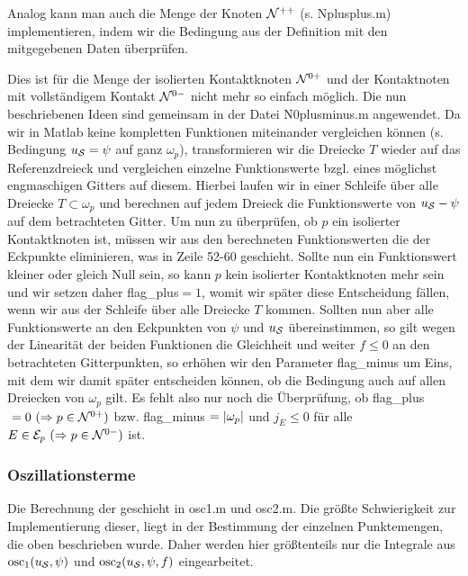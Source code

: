 Analog kann man auch die Menge der Knoten $\mathcal N^{++}$ (s. {\ttfamily Nplusplus.m})  implementieren, indem wir  die Bedingung aus der Definition mit den mitgegebenen Daten überprüfen.

Dies ist für die Menge der isolierten Kontaktknoten $\mathcal N^{0+}$ und der Kontaktnoten mit vollständigem Kontakt $\mathcal N^{0-}$ nicht mehr so einfach möglich. Die nun beschriebenen Ideen sind gemeinsam in der Datei {\ttfamily N0plusminus.m} angewendet. Da wir in Matlab keine kompletten Funktionen miteinander vergleichen können (s. Bedingung $u_{\mathcal S} = \psi$ auf ganz $\omega_p$), transformieren wir die Dreiecke $T$ wieder auf das Referenzdreieck und vergleichen einzelne Funktionswerte bzgl. eines möglichst engmaschigen Gitters auf diesem. Hierbei laufen wir in einer Schleife über alle Dreiecke $T \subset \omega_p$ und berechnen auf jedem Dreieck die Funktionswerte von $u_{\mathcal S}-\psi$ auf dem betrachteten Gitter. Um nun zu überprüfen, ob $p$ ein isolierter Kontaktknoten ist, müssen wir aus den berechneten Funktionswerten die der Eckpunkte eliminieren, was in Zeile 52-60 geschieht. Sollte nun ein Funktionswert kleiner oder gleich Null sein, so kann $p$ kein isolierter Kontaktknoten mehr sein und wir setzen daher {\ttfamily flag_plus}$=1$, womit wir später diese Entscheidung fällen, wenn wir aus der Schleife über alle Dreiecke $T$ kommen. Sollten nun aber alle Funktionswerte an den Eckpunkten von $\psi$ und $u_{\mathcal S}$ übereinstimmen, so gilt wegen der Linearität der beiden Funktionen die Gleichheit und weiter $f\le 0$ an den betrachteten Gitterpunkten, so erhöhen wir den Parameter {\ttfamily flag_minus} um Eins, mit dem wir  damit später entscheiden können, ob die Bedingung auch auf allen Dreiecken von $\omega_p$ gilt. Es fehlt also nur noch die Überprüfung, ob {\ttfamily flag_plus}$\ =0 \ (\Rightarrow p \in \mathcal N^{0+})$ bzw. {\ttfamily flag_minus}$\ =\abs{\omega_p}$ und $j_E \le 0$ für alle $E \in\mathcal E_p \ (\Rightarrow p \in \mathcal N^{0-})$ ist.


\subsubsection{Oszillationsterme}

Die Berechnung der  geschieht in {\ttfamily osc1.m} und {\ttfamily osc2.m}. Die größte Schwierigkeit zur Implementierung dieser, liegt in der Bestimmung der einzelnen Punktemengen, die oben beschrieben wurde. Daher werden hier größtenteils nur die Integrale aus $\operatorname{osc}_1(u_{\mathcal S},\psi)$ und $\operatorname{osc}_2(u_{\mathcal S},\psi,f)$ eingearbeitet.


